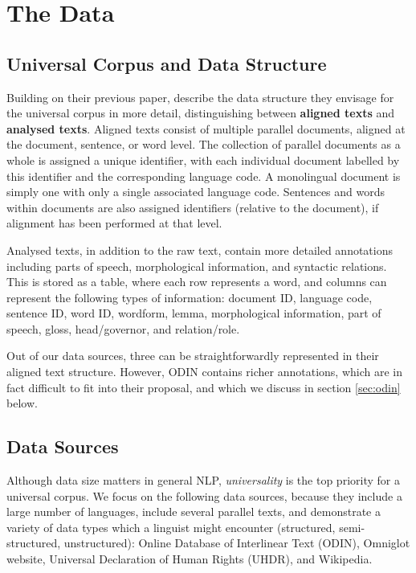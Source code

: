 \section{The Data}\label{sec:data}



\subsection{Universal Corpus and Data Structure} \label{sec:structure}

Building on their previous paper,  describe the data structure they envisage for the universal corpus in more detail, distinguishing between \textbf{aligned texts} and \textbf{analysed texts}. Aligned texts consist of multiple parallel documents, aligned at the document, sentence, or word level. The collection of parallel documents as a whole is assigned a unique identifier, with each individual document labelled by this identifier and the corresponding language code.  A monolingual document is simply one with only a single associated language code.  Sentences and words within documents are also assigned identifiers (relative to the document), if alignment has been performed at that level.

Analysed texts, in addition to the raw text, contain more detailed annotations including parts of speech, morphological information, and syntactic relations.  This is stored as a table, where each row represents a word, and columns can represent the following types of information: document ID, language code, sentence ID, word ID, wordform, lemma, morphological information, part of speech, gloss, head/governor, and relation/role.

Out of our data sources, three can be straightforwardly represented in their aligned text structure. However, ODIN contains richer annotations, which are in fact difficult to fit into their proposal, and which we discuss in section \ref{sec:odin} below.


\subsection{Data Sources} \label{sec:sources}

Although data size matters in general NLP, \emph{universality} is the top priority for a universal corpus. We focus on the following data sources, because they include a large number of languages, include several parallel texts, and demonstrate a variety of data types which a linguist might encounter (structured, semi-structured, unstructured): Online Database of Interlinear Text (ODIN), Omniglot website, Universal Declaration of Human Rights (UHDR), and Wikipedia.

